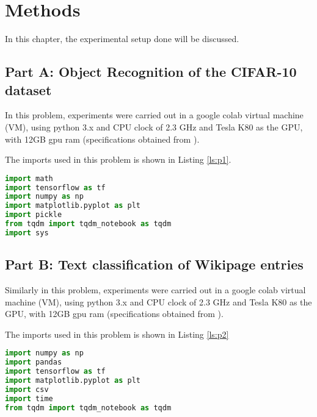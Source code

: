\chapter{Methods}
\label{methods}

In this chapter, the experimental setup done will be discussed.

\section{Part A: Object Recognition of the CIFAR-10 dataset}
In this problem, experiments were carried out in a google colab virtual machine (VM), using python 3.x and CPU clock of 2.3 GHz and Tesla K80 as the GPU, with 12GB gpu ram (specifications obtained from \cite{carneiro2018performance}).

The imports used in this problem is shown in Listing \ref{ls:p1}.

\begin{lstlisting}[language=Python, caption= Imports used for problem 1, label=ls:p1]
import math
import tensorflow as tf
import numpy as np
import matplotlib.pyplot as plt
import pickle
from tqdm import tqdm_notebook as tqdm
import sys
\end{lstlisting}

\section{Part B: Text classification of Wikipage entries}
Similarly in this problem, experiments were carried out in a google colab virtual machine (VM), using python 3.x and CPU clock of 2.3 GHz and Tesla K80 as the GPU, with 12GB gpu ram (specifications obtained from \cite{carneiro2018performance}).

The imports used in this problem is shown in Listing \ref{ls:p2}

\begin{lstlisting}[language=Python, caption= Imports used for problem 2, label=ls:p2]
import numpy as np
import pandas
import tensorflow as tf
import matplotlib.pyplot as plt
import csv
import time
from tqdm import tqdm_notebook as tqdm
\end{lstlisting}
